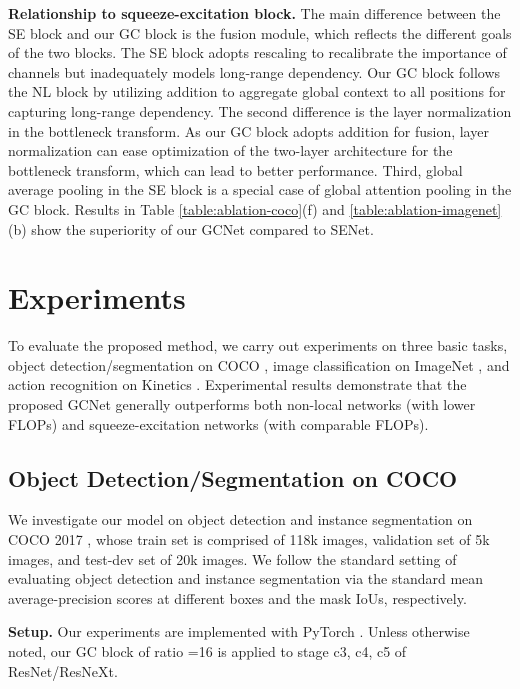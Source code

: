 \documentclass[10pt,twocolumn,letterpaper]{article}
\begin{document}
\textbf{Relationship to squeeze-excitation block.}
The main difference between the SE block and our GC block is the fusion module, which reflects the different goals of the two blocks. 
The SE block adopts rescaling to recalibrate the importance of channels but inadequately models long-range dependency.
Our GC block follows the NL block by utilizing addition to aggregate global context to all positions for capturing long-range dependency.
The second difference is the layer normalization in the bottleneck transform.
As our GC block adopts addition for fusion, layer normalization can ease optimization of the two-layer architecture for the bottleneck transform, which can lead to better performance. 
Third, global average pooling in the SE block is a special case of global attention pooling in the GC block. 
Results in Table \ref{table:ablation-coco}(f) and \ref{table:ablation-imagenet}(b) show the superiority of our GCNet compared to SENet.


\section{Experiments}
To evaluate the proposed method, we carry out experiments on three basic tasks, object detection/segmentation on COCO \cite{lin2014coco}, image classification on ImageNet \cite{deng2009imagenet}, and action recognition on Kinetics \cite{kay2017kinetics}.
Experimental results demonstrate that the proposed GCNet generally outperforms both non-local networks (with lower FLOPs) and squeeze-excitation networks (with comparable FLOPs).

\subsection{Object Detection/Segmentation on COCO}
We investigate our model on object detection and instance segmentation on COCO 2017 \cite{lin2014coco}, whose train set is comprised of 118k images, validation set of 5k images, and test-dev set of 20k images.
We follow the standard setting \cite{he2017mask} of evaluating object detection and instance segmentation via the standard mean average-precision scores at different
boxes and the mask IoUs, respectively.


\textbf{Setup.}
Our experiments are implemented with PyTorch \cite{paszke2017pytorch}.
Unless otherwise noted, our GC block of ratio =16 is applied to stage c3, c4, c5 of ResNet/ResNeXt.
\end{document}
